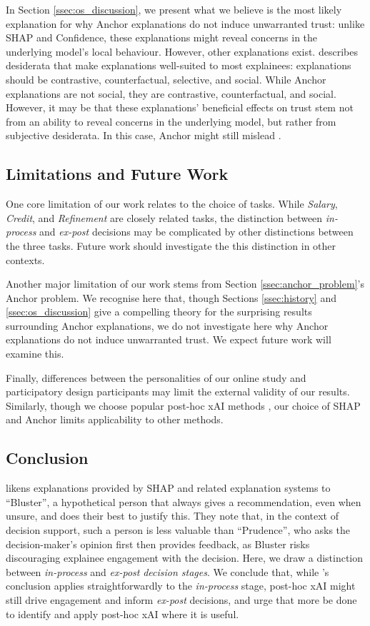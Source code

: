 In Section \ref{ssec:os_discussion}, we present what we believe is the most likely explanation for why Anchor explanations do not induce unwarranted trust: unlike SHAP and Confidence, these explanations might reveal concerns in the underlying model's local behaviour. However, other explanations exist. \textcite{Miller} describes desiderata that make explanations well-suited to most explainees: explanations should be contrastive, counterfactual, selective, and social. While Anchor explanations are not social, they are contrastive, counterfactual, and social. However, it may be that these explanations' beneficial effects on trust stem not from an ability to reveal concerns in the underlying model, but rather from subjective desiderata. In this case, Anchor might still mislead \cite{Lipton}.

\subsection{Limitations and Future Work}
One core limitation of our work relates to the choice of tasks. While \emph{Salary}, \emph{Credit}, and \emph{Refinement} are closely related tasks, the distinction between \emph{in-process} and \emph{ex-post} decisions may be complicated by other distinctions between the three tasks. Future work should investigate the this distinction in other contexts.

Another major limitation of our work stems from Section \ref{ssec:anchor_problem}'s Anchor problem. We recognise here that, though Sections \ref{ssec:history} and \ref{ssec:os_discussion} give a compelling theory for the surprising results surrounding Anchor explanations, we do not investigate here why Anchor explanations do not induce unwarranted trust. We expect future work will examine this.

Finally, differences between the personalities of our online study and participatory design participants may limit the external validity of our results. Similarly, though we choose popular post-hoc xAI methods \cite{Barocas_Selbst_Raghavan_2020,kumar_problems_2020,Weerts-et-al-evaluation,Ribeiro-et-al-alime}, our choice of SHAP and Anchor limits applicability to other methods.

\subsection{Conclusion}
\textcite{Miller_2023} likens explanations provided by SHAP and related explanation systems to ``Bluster'', a hypothetical person that always gives a recommendation, even when unsure, and does their best to justify this. They note that, in the context of decision support, such a person is less valuable than ``Prudence'', who asks the decision-maker's opinion first then provides feedback, as Bluster risks discouraging explainee engagement with the decision. Here, we draw a distinction between \emph{in-process} and \emph{ex-post} \emph{decision stages}. We conclude that, while \textcite{Miller_2023}'s conclusion applies straightforwardly to the \emph{in-process} stage, post-hoc xAI might still drive engagement and inform \emph{ex-post} decisions, and urge that more be done to identify and apply post-hoc xAI where it is useful.
